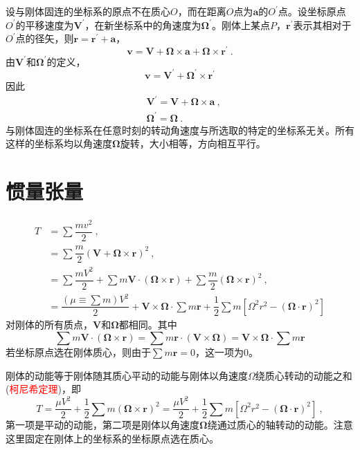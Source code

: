 \documentclass[12pt,a4paper]{article}
\renewcommand{\vec}[1]{\boldsymbol{#1}}
\begin{document}
设与刚体固连的坐标系的原点不在质心$O$，而在距离$O$点为$\vec{a}$的$O^\prime$点。设坐标原点$O^\prime$的平移速度为$\vec{V}^\prime$，在新坐标系中的角速度为$\vec{\Omega}^\prime$。刚体上某点$P$，$\vec{r}^\prime$表示其相对于$O^\prime$点的径矢，则$\vec{r} = \vec{r}^\prime +\vec{a}$，
\begin{equation*}
\vec{v} =  \vec{V} + \vec{\Omega} \times \vec{a} + \vec{\Omega} \times \vec{r}^\prime ~.
\end{equation*}
由$\vec{V}^\prime$和$\vec{\Omega}^\prime$的定义，
\begin{equation*}
\vec{v} = \vec{V}^\prime + \vec{\Omega}^\prime \times \vec{r}^\prime
\end{equation*}
因此
\begin{align}
& \vec{V}^\prime = \vec{V} +\vec{\Omega} \times \vec{a} ~, \\
& \vec{\Omega}^\prime = \vec{\Omega} ~.
\end{align}
与刚体固连的坐标系在任意时刻的转动角速度与所选取的特定的坐标系无关。所有这样的坐标系均以角速度$\vec{\Omega}$旋转，大小相等，方向相互平行。



\section{惯量张量}
\cite{2007理论物理学教程} \begin{align}
\nonumber T &= \sum \dfrac{mv^2}{2} ~, \\
\nonumber &= \sum \dfrac{m}{2} (\vec{V} +\vec{\Omega} \times \vec{r})^2 ~, \\
\nonumber &= \sum \dfrac{m V^2}{2} +\sum m\vec{V}\cdot (\vec{\Omega} \times \vec{r}) +\sum \dfrac{m}{2}  (\vec{\Omega} \times \vec{r})^2 ~, \\
\nonumber &= \dfrac{(\mu \equiv \sum m) V^2}{2} + \vec{V} \times \vec{\Omega} \cdot \sum m \vec{r} +\dfrac{1}{2} \sum m \left[\Omega^2 r^2 -(\vec{\Omega} \cdot \vec{r})^2 \right]
\end{align}
对刚体的所有质点，$\vec{V}$和$\vec{\Omega}$都相同。其中
\begin{equation}
\sum m\vec{V}\cdot (\vec{\Omega} \times \vec{r}) = \sum m \vec{r}\cdot (\vec{V} \times \vec{\Omega}) = \vec{V} \times \vec{\Omega} \cdot \sum m \vec{r}
\end{equation}
若坐标原点选在刚体质心，则由于$\sum m \vec{r} = 0$，这一项为$0$。

刚体的动能等于刚体随其质心平动的动能与刚体以角速度$\Omega$绕质心转动的动能之和(\textcolor{red}{柯尼希定理})，即
\begin{equation}
T = \dfrac{ \mu V^2}{2} +\dfrac{1}{2} \sum m(\vec{\Omega} \times \vec{r})^2 = \dfrac{ \mu V^2}{2} +\dfrac{1}{2} \sum m \left[\Omega^2 r^2 -(\vec{\Omega} \cdot \vec{r})^2 \right] ~,
\end{equation}
第一项是平动的动能，第二项是刚体以角速度$\vec{\Omega}$绕通过质心的轴转动的动能。注意这里固定在刚体上的坐标系的坐标原点选在质心。
\end{document}

